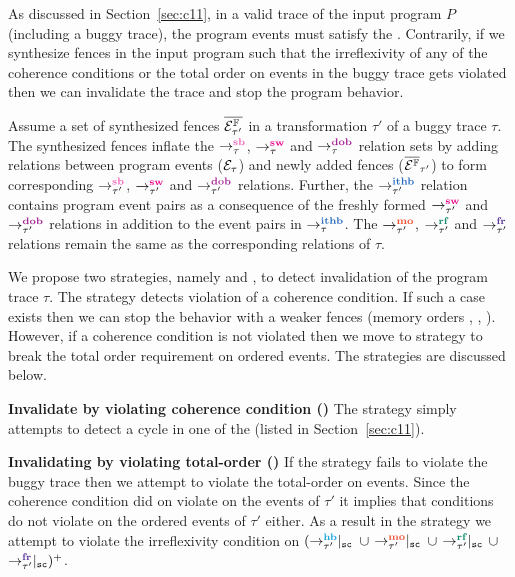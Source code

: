 As discussed in Section~\ref{sec:c11}, in a valid trace of the
input program $P$ (including a buggy trace), 
the program events must satisfy the .
%
Contrarily, if we synthesize \cc fences in the input program 
such that the irreflexivity of any of the coherence conditions 
or the total order on \sc events in the buggy trace gets violated 
then we can invalidate the trace and stop the program behavior.

Assume a set of synthesized \cc fences $\overline{\mathcal{E}^{\mathbb{F}}_{\tau'}}$
in a transformation $\tau'$ of a buggy trace $\tau$. 
%
The synthesized fences inflate the 
$\setSB$, $\setSW$ and $\setDOB$ relation sets by adding 
relations between program events ($\mathcal{E}_\tau$) and newly 
added fences ($\overline{\mathcal{E}^{\mathbb{F}}}_{\tau'}$) to form corresponding 
$\seqb{\tau'}{}{}$, $\sw{\tau'}{}{}$ and $\dob{\tau'}{}{}$ relations. 
%
Further, the $\ithb{\tau'}{}{}$ relation contains  
program event pairs as a consequence of the freshly formed 
$\sw{\tau'}{}{}$ and $\dob{\tau'}{}{}$ relations in addition
to the event pairs in $\setITHB$.
%
The $\mo{\tau'}{}{}$, $\rf{\tau'}{}{}$ and $\fr{\tau'}{}{}$ 
relations remain the same as the corresponding relations of 
$\tau$.

We propose two strategies, namely \stfence and \wkfence, to 
detect invalidation of the program trace $\tau$. 
%
The \wkfence strategy detects violation of a coherence condition.
If such a case exists then we can stop the behavior with a 
weaker fences (memory orders \rel, \acq, \acqrel). 
%
However, if a coherence condition is not violated then we move
to \stfence strategy to break the total order requirement on
\sc ordered events.
%
The strategies are discussed below.\newline

\noindent
{\bf Invalidate by violating coherence condition (\wkfence)}\newline
The \wkfence strategy simply attempts to detect a cycle in 
one of the  (listed in 
Section~\ref{sec:c11}).
\newline

\noindent
{\bf Invalidating by violating \sc total-order (\stfence)}\newline
If the \wkfence strategy fails to violate the buggy trace then
we attempt to violate the total-order on \sc events.
%
Since the coherence condition did on violate on the events of $\tau'$ 
it implies that conditions do not violate on the \sc ordered events
of $\tau'$ either. 
%
As a result in the \stfence strategy we attempt to violate the 
irreflexivity condition on 
$(\onsc{\hb{\tau'}{}{}}$ $\cup$ $\onsc{\mo{\tau'}{}{}}$ $\cup$ 
$\onsc{\rf{\tau'}{}{}}$ $\cup$ $\onsc{\fr{\tau'}{}{}})^+$. 

